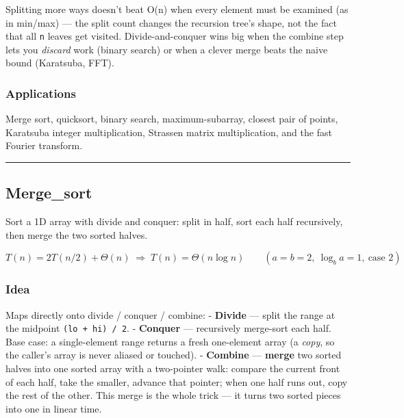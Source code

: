 \documentclass[
  10pt,
  letterpaper,
  onecolumn]{article}
\begin{document}
Splitting more ways doesn't beat O(n) when every element must be
examined (as in min/max) --- the split count changes the recursion
tree's shape, not the fact that all \texttt{n} leaves get visited.
Divide-and-conquer wins big when the combine step lets you
\emph{discard} work (binary search) or when a clever merge beats the
naive bound (Karatsuba, FFT).

\hypertarget{applications}{%
\subsubsection{Applications}\label{applications}}

Merge sort, quicksort, binary search, maximum-subarray, closest pair of
points, Karatsuba integer multiplication, Strassen matrix
multiplication, and the fast Fourier transform.

\begin{center}\rule{0.5\linewidth}{0.5pt}\end{center}

\hypertarget{merge_sort}{%
\subsection{Merge\_sort}\label{merge_sort}}

Sort a 1D array with divide and conquer: split in half, sort each half
recursively, then merge the two sorted halves.

\begin{equation*}
T(n)=2T(n/2)+\Theta(n)
\;\Longrightarrow\;
T(n)=\Theta(n\log n)
\qquad (a=b=2,\ \log_b a=1,\ \text{case 2})
\end{equation*}

\hypertarget{idea-4}{%
\subsubsection{Idea}\label{idea-4}}

Maps directly onto divide / conquer / combine: - \textbf{Divide} ---
split the range at the midpoint \texttt{(lo\ +\ hi)\ /\ 2}. -
\textbf{Conquer} --- recursively merge-sort each half. Base case: a
single-element range returns a fresh one-element array (a \emph{copy},
so the caller's array is never aliased or touched). - \textbf{Combine}
--- \textbf{merge} two sorted halves into one sorted array with a
two-pointer walk: compare the current front of each half, take the
smaller, advance that pointer; when one half runs out, copy the rest of
the other. This merge is the whole trick --- it turns two sorted pieces
into one in linear time.
\end{document}
